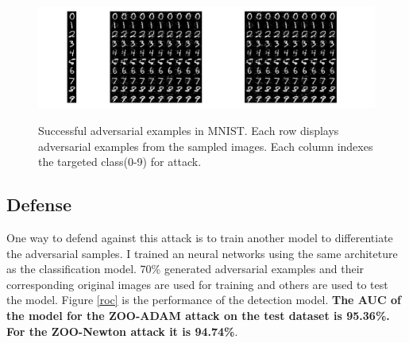 \documentclass[a4paper]{article}
\begin{document}
\begin{figure}
\centering
\includegraphics[scale=0.3]{resjpg.jpg}
\label{ae}
\caption{Successful adversarial examples in MNIST. Each row displays adversarial examples from the sampled images. Each column indexes the targeted class(0-9) for attack.}
\end{figure}

\subsection{Defense}
One way to defend against this attack is to train another model to differentiate the adversarial samples.
I trained an neural networks using the same architeture as the classification model. 70\% generated adversarial examples and their corresponding original images are used for training and others are used to test the model. 
Figure \ref{roc} is the performance of the detection model. \textbf{The AUC of the model for the ZOO-ADAM attack on the test dataset is 95.36\%. For the ZOO-Newton attack it is 94.74\%}.
\end{document}
